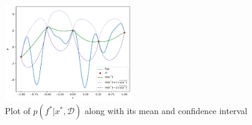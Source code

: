 \begin{figure}[H]
    \includegraphics[width=0.49\textwidth]{figures/gp/plot.pdf}
    \caption{Plot of $p(f^*|x^*,\mathcal{D})$ along with its mean and confidence interval}
\end{figure}